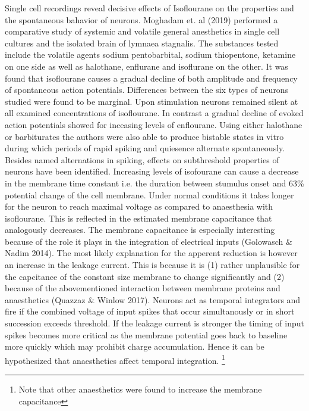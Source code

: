 Single cell recordings reveal decisive effects of Isoflourane on the properties and the spontaneous bahavior of neurons. Moghadam et. al (2019) performed a comparative study of systemic and volatile general anesthetics in single cell cultures and the isolated brain of lymnaea stagnalis. The substances tested include the volatile agents sodium pentobarbital, sodium thiopentone, ketamine on one side as well as halothane, enflurane and isoflurane on the other. It was found that isoflourane causes a gradual decline of both amplitude and frequency of spontaneous action potentials. Differences between the six types of neurons studied were found to be marginal. Upon stimulation neurons remained silent at all examined concentrations of isoflourane. In contrast a gradual decline of evoked action potentials showed for inceasing levels of enflourane. Using either halothane or barbiturates the authors were also able to produce bistable states in vitro during which periods of rapid spiking and quiesence alternate spontaneously.\\
Besides named alternations in spiking, effects on subthreshold properties of neurons have been identified. Increasing levels of isofourane can cause a decrease in the membrane time constant i.e. the duration between stumulus onset and 63\% potential change of the cell membrane. Under normal conditions it takes longer for the neuron to reach maximal voltage as compared to anaesthesia with isoflourane. This is reflected in the estimated membrane capacitance that analogously decreases. The membrane capacitance is especially interesting because of the role it plays in the integration of electrical inputs (Golowasch \& Nadim 2014). The most likely explanation for the apperent reduction is however an increase in the leakage current. This is because it is (1) rather unplausible for the capcitance of the constant size membrane to change significantly and (2) because of the abovementioned interaction between membrane proteins and anaesthetics (Quazzaz \& Winlow 2017). Neurons act as temporal integrators and fire if the combined voltage of input spikes that occur simultanously or in short succession exceeds threshold. If the leakage current is stronger the timing of input spikes becomes more critical as the membrane potential goes back to baseline more quickly which may prohibit charge accumulation. Hence it can be hypothesized that anaesthetics affect temporal integration.  \footnote{ Note that other anaesthetics were found to increase the membrane capacitance}\\
